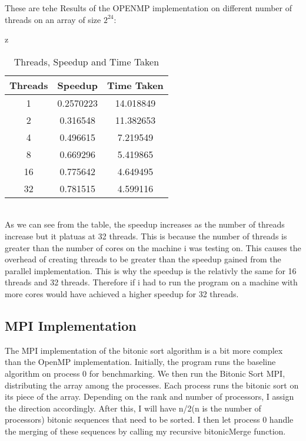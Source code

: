 These are tehe Results of the OPENMP implementation on different number of
threads on an array of size  $2^{24}$:
\begin{table}[ht]z
    \centering
    \setlength{\tabcolsep}{10pt} %
    \begin{tabular}{|c|c|c|}
        \hline
        \textbf{Threads} & \textbf{Speedup} & \textbf{Time Taken} \\
        \hline
        1                & 0.2570223        & 14.018849           \\
        2                & 0.316548         & 11.382653           \\
        4                & 0.496615         & 7.219549            \\
        8                & 0.669296         & 5.419865            \\
        16               & 0.775642         & 4.649495            \\
        32               & 0.781515         & 4.599116            \\
        \hline
    \end{tabular}
    \caption{Threads, Speedup and Time Taken}
    \label{table:1}
\end{table}\\
As we can see from the table, the speedup increases as the number of threads
increase but it platuas at 32 threads. This is because the number of threads is
greater than the number of cores on the machine i was testing on. This causes
the overhead of
creating threads to be greater than the speedup gained from the parallel
implementation. This is why the speedup is the relativly the same for 16
threads and 32 threads.
Therefore if i had to run the program on a machine with more cores would have
achieved a higher speedup for 32 threads.

\subsection{MPI Implementation}
The MPI implementation of the bitonic sort algorithm is a bit more complex than
the OpenMP implementation. Initially, the program runs the baseline algorithm
on process 0 for benchmarking. We then run the Bitonic Sort MPI, distributing
the array among the processes. Each process runs the bitonic sort on its piece
of the array. Depending on the rank and number of processors, I assign the
direction accordingly. After this, I will have n/2(n is the number of
processors) bitonic sequences that need
to be sorted. I then let process 0 handle the merging of these sequences by
calling my recursive bitonicMerge function.


